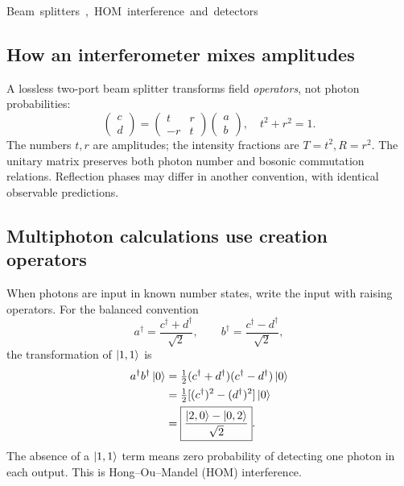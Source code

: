\unit{Beam splitters, HOM interference and detectors}
\subsection{How an interferometer mixes amplitudes}
A lossless two-port beam splitter transforms field
\emph{operators}, not photon probabilities:
\[
\boxed{
\begin{pmatrix}c\\d\end{pmatrix}=
\begin{pmatrix}t&r\\-r&t\end{pmatrix}
\begin{pmatrix}a\\b\end{pmatrix},
\quad t^2+r^2=1.}
\]
The numbers \(t,r\) are amplitudes; the
intensity fractions are \(T=t^2,R=r^2\).
The unitary matrix preserves both photon number
and bosonic commutation relations. Reflection
phases may differ in another convention, with
identical observable predictions.

\begin{center}
\end{center}

\subsection{Multiphoton calculations use creation operators}
When photons are input in known number states,
write the input with raising operators. For
the balanced convention
\[
a^\dagger=\frac{c^\dagger+d^\dagger}{\sqrt2},
\qquad
b^\dagger=\frac{c^\dagger-d^\dagger}{\sqrt2},
\]
the transformation of \(\left\lvert 1,1\right\rangle\) is
\[
\begin{aligned}
a^\dagger b^\dagger\left\lvert 0\right\rangle
&=\tfrac12(c^\dagger+d^\dagger)
(c^\dagger-d^\dagger)\left\lvert 0\right\rangle\\
&=\tfrac12[(c^\dagger)^2-(d^\dagger)^2]\left\lvert 0\right\rangle\\
&=\boxed{\frac{\left\lvert 2,0\right\rangle-\left\lvert 0,2\right\rangle}{\sqrt2}}.
\end{aligned}
\]
The absence of a \(\left\lvert 1,1\right\rangle\) term means
zero probability of detecting one photon
in each output. This is Hong--Ou--Mandel
(HOM) interference.

